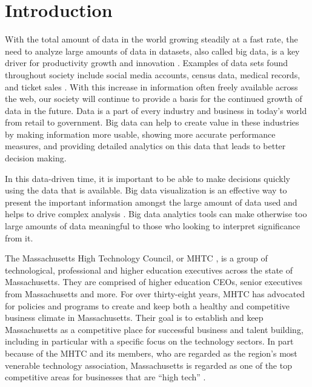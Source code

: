 \chapter{Introduction}

	With the total amount of data in the world growing steadily at a fast rate, 
	the need to analyze large amounts of data in datasets, also called big data, is a 
	key driver for productivity growth and innovation \cite{bigdata}. Examples of data sets found throughout society include social media accounts, census data, medical records, and ticket sales \cite{bdex}. With this increase in 
	information often freely available across the web, 
	our society will continue to provide a basis for the continued growth of 
	data in the future. Data is a part of every industry and business in today's 
	world from retail to government. Big data can help to create
	 value in these industries by making information more usable, showing more 
	 accurate performance measures, and providing detailed analytics on this data that 
	 leads to better decision making.

	In this data-driven time, it is important to be able to make decisions 
	quickly using the data that is available. Big data visualization is an 
	effective way to present the important information amongst the large amount 
	of data used and helps to drive complex analysis \cite{bigdata}. Big 
	data analytics tools can make otherwise too large amounts of data meaningful 
	to those who looking to interpret significance from it.

	The Massachusetts High Technology Council, or MHTC \cite{mhtc}, is a group of technological, 
	professional and higher education executives across the state of Massachusetts. 
	They are comprised of higher education CEOs, senior executives from Massachusetts 
	and more. For over thirty-eight years, MHTC has advocated for policies 
	and programs to create and keep both a healthy and competitive business climate in Massachusetts. 
	Their goal is to establish and keep Massachusetts as a competitive place for 
	successful business and talent building, including in particular with a specific focus on the 
	technology sectors. In part because of the MHTC and its members, who are 
	regarded as the region's most venerable technology association, Massachusetts 
	is regarded as one of the top competitive areas for businesses that are “high tech” \cite{mhtc}.

